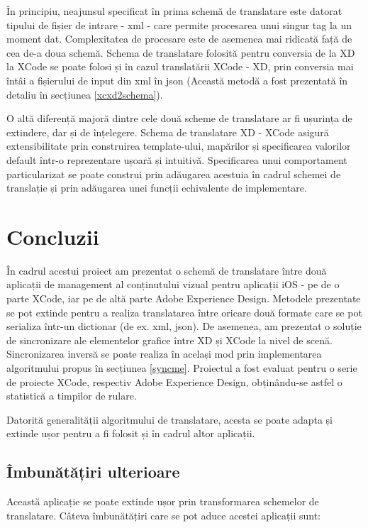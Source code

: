 În principiu, neajunsul specificat în prima schemă de translatare este datorat tipului de fișier de intrare - xml - care permite procesarea unui singur tag la un moment dat. Complexitatea de procesare este de asemenea mai ridicată față de cea de-a doua schemă.
Schema de translatare folosită pentru conversia de la XD la XCode se poate folosi și în cazul translatării XCode - XD, prin conversia mai întâi a fișierului de input din xml în json (Această metodă a fost prezentată în detaliu în secțiunea \ref{xcxd2schema}).

O altă diferență majoră dintre cele două scheme de translatare ar fi ușurința de extindere, dar și de înțelegere. Schema de translatare XD - XCode asigură extensibilitate prin construirea template-ului, mapărilor și specificarea valorilor default într-o reprezentare ușoară și intuitivă. Specificarea unui comportament particularizat se poate construi prin adăugarea acestuia în cadrul schemei de translație și prin adăugarea unei funcții echivalente de implementare. 

\chapter{Concluzii}

În cadrul acestui proiect am prezentat o schemă de translatare între două aplicații de management al conținutului vizual pentru aplicații iOS - pe de o parte XCode, iar pe de altă parte Adobe Experience Design. Metodele prezentate se pot extinde pentru a realiza translatarea între oricare două formate care se pot serializa într-un dictionar (de ex. xml, json). De asemenea, am prezentat o soluție de sincronizare ale elementelor grafice între XD și XCode la nivel de scenă. Sincronizarea inversă se poate realiza în același mod prin implementarea algoritmului propus în secțiunea \ref{syncme}. Proiectul a fost evaluat pentru o serie de proiecte XCode, respectiv Adobe Experience Design, obținându-se astfel o statistică a timpilor de rulare.

Datorită generalității algoritmului de translatare, acesta se poate adapta și extinde ușor pentru a fi folosit și în cadrul altor aplicații.

\section{Îmbunătățiri ulterioare}

Această aplicație se poate extinde ușor prin transformarea schemelor de translatare.
Câteva îmbunătățiri care se pot aduce acestei aplicații sunt:

